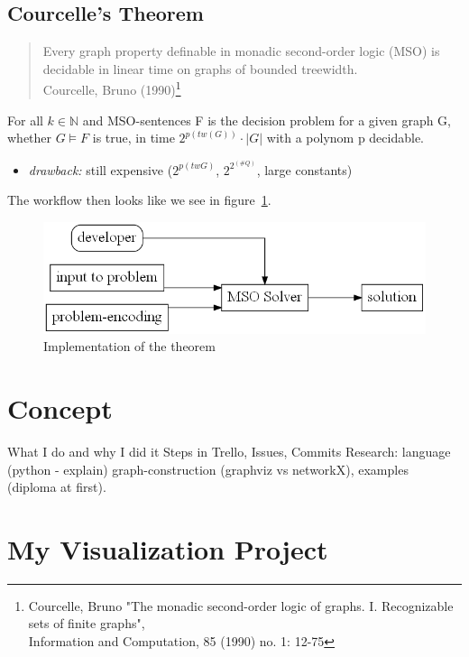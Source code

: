 \documentclass[a4paper, 12pt]{scrartcl}
\begin{document}
\subsection{Courcelle's Theorem}
\begin{quotation}
	Every graph property definable in monadic second-order logic (MSO) is decidable in linear time on graphs of bounded treewidth.\\
	{\small Courcelle, Bruno (1990)}\footnote{Courcelle, Bruno "The monadic second-order logic of graphs. I. Recognizable sets of finite graphs",\\ Information and Computation, 85 (1990) no. 1: 12-75}
\end{quotation}

For all $k \in \mathbb{N}$ and MSO-sentences F is the decision problem for a given graph G, whether $G \models F$ is true, in time $2^{p(tw(G))} \cdot |G|$ with a polynom p decidable.
\begin{itemize}
	
	\item \emph{drawback:} still expensive ($2^{p(tw G)}$, $2^{2^{(\#Q)}}$, large constants) \smallskip 

\end{itemize}

The workflow then looks like we see in figure~\ref{fig:UsageCourcelle}.

\begin{figure}[H]
	\includegraphics[height=0.2\textheight]{images/UsageCourcelle.gv.png}
	\caption{Implementation of the theorem}
	\label{fig:UsageCourcelle}
\end{figure}

\newpage
\section{Concept}
What I do and why I did it
Steps in Trello, Issues, Commits
Research: language (python - explain) graph-construction (graphviz vs networkX), examples (diploma at first). 
\newpage
\section{My Visualization Project}
\end{document}
